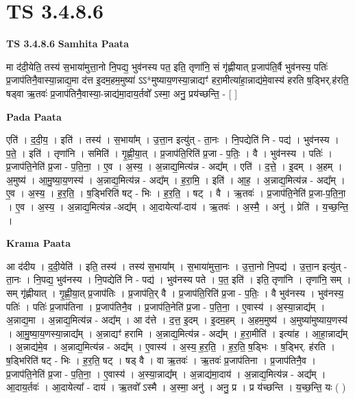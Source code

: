 \documentclass[17pt]{extarticle}
\begin{document}
\section{ TS 3.4.8.6 }

\textbf{TS 3.4.8.6 } \newline
\textbf{Samhita Paata} \newline

मा द॑दी॒येति॒ तस्य॑ स॒भाया॑मुत्ता॒नो नि॒पद्य॒ भुव॑नस्य पत॒ इति॒ तृणा॑नि॒ सं गृ॑ह्णीयात् प्र॒जाप॑ति॒र्वै भुव॑नस्य॒ पतिः॑ प्र॒जाप॑तिनै॒वास्या॒न्नाद्य॒मा द॑त्त इ॒दम॒हम॒मुष्या॑ ऽऽ*मुष्याय॒णस्या॒न्नाद्यꣳ॑ हरा॒मीत्या॑हा॒न्नाद्य॑मे॒वास्य॑ हरति ष॒ड्भिर्.ह॑रति॒ षड्वा ऋ॒तवः॑ प्र॒जाप॑तिनै॒वास्या॒-न्नाद्य॑मा॒दाय॒र्तवो᳚ ऽस्मा॒ अनु॒ प्रय॑च्छन्ति॒ - [  ] \newline

\textbf{Pada Paata} \newline

एति॑ । द॒दी॒य॒ । इति॑ । तस्य॑ । स॒भाया᳚म् । उ॒त्ता॒न इत्यु॑त् - ता॒नः । नि॒पद्येति॑ नि - पद्य॑ । भुव॑नस्य । प॒ते॒ । इति॑ । तृणा॑नि । समिति॑ । गृ॒ह्णी॒या॒त् । प्र॒जाप॑ति॒रिति॑ प्र॒जा - प॒तिः॒ । वै । भुव॑नस्य । पतिः॑ । प्र॒जाप॑ति॒नेति॑ प्र॒जा - प॒ति॒ना॒ । ए॒व । अ॒स्य॒ । अ॒न्नाद्य॒मित्य॑न्न - अद्य᳚म् । एति॑ । द॒त्ते॒ । इ॒दम् । अ॒हम् । अ॒मुष्य॑ । आ॒मु॒ष्या॒य॒णस्य॑ । अ॒न्नाद्य॒मित्य॑न्न - अद्य᳚म् । ह॒रा॒मि॒ । इति॑ । आ॒ह॒ । अ॒न्नाद्य॒मित्य॑न्न - अद्य᳚म् । ए॒व । अ॒स्य॒ । ह॒र॒ति॒ । ष॒ड्भिरिति॑ षट् - भिः । ह॒र॒ति॒ । षट् । वै । ऋ॒तवः॑ । प्र॒जाप॑ति॒नेति॑ प्र॒जा-प॒ति॒ना॒ । ए॒व । अ॒स्य॒ । अ॒न्नाद्य॒मित्य॑न्न -अद्य᳚म् । आ॒दायेत्या᳚-दाय॑ । ऋ॒तवः॑ । अ॒स्मै॒ । अनु॑ । प्रेति॑ । य॒च्छ॒न्ति॒ ।  \newline


\textbf{Krama Paata} \newline

आ द॑दीय । द॒दी॒येति॑ । इति॒ तस्य॑ । तस्य॑ स॒भाया᳚म् । स॒भाया॑मुत्ता॒नः । उ॒त्ता॒नो नि॒पद्य॑ । उ॒त्ता॒न इत्यु॑त् - ता॒नः । नि॒पद्य॒ भुव॑नस्य । नि॒पद्येति॑ नि - पद्य॑ । भुव॑नस्य पते । प॒त॒ इति॑ । इति॒ तृणा॑नि । तृणा॑नि॒ सम् । सम् गृ॑ह्णीयात् । गृ॒ह्णी॒या॒त् प्र॒जाप॑तिः । प्र॒जाप॑ति॒र् वै । प्र॒जाप॑ति॒रिति॑ प्र॒जा - प॒तिः॒ । वै भुव॑नस्य । भुव॑नस्य॒ पतिः॑ । पतिः॑ प्र॒जाप॑तिना । प्र॒जाप॑तिनै॒व । प्र॒जाप॑ति॒नेति॑ प्र॒जा - प॒ति॒ना॒ । ए॒वास्य॑ । अ॒स्या॒न्नाद्य᳚म् । अ॒न्नाद्य॒मा । अ॒न्नाद्य॒मित्य॑न्न - अद्य᳚म् । आ द॑त्ते । द॒त्त॒ इ॒दम् । इ॒दम॒हम् । अ॒हम॒मुष्य॑ । अ॒मुष्या॑मुष्याय॒णस्य॑ । आ॒मु॒ष्या॒य॒णस्या॒न्नाद्य᳚म् । अ॒न्नाद्यꣳ॑ हरामि । अ॒न्नाद्य॒मित्य॑न्न - अद्य᳚म् । ह॒रा॒मीति॑ । इत्या॑ह । आ॒हा॒न्नाद्य᳚म् । अ॒न्नाद्य॑मे॒व । अ॒न्नाद्य॒मित्य॑न्न - अद्य᳚म् । ए॒वास्य॑ । अ॒स्य॒ ह॒र॒ति॒ । ह॒र॒ति॒ ष॒ड्भिः । ष॒ड्भिर्. ह॑रति । ष॒ड्भिरिति॑ षट् - भिः । ह॒र॒ति॒ षट् । षड् वै । वा ऋ॒तवः॑ । ऋ॒तवः॑ प्र॒जाप॑तिना । प्र॒जाप॑तिनै॒व । प्र॒जाप॑ति॒नेति॑ प्र॒जा - प॒ति॒ना॒ । ए॒वास्य॑ । अ॒स्या॒न्नाद्य᳚म् । अ॒न्नाद्य॑मा॒दाय॑ । अ॒न्नाद्य॒मित्य॑न्न - अद्य᳚म् । आ॒दाय॒र्तवः॑ । आ॒दायेत्या᳚ - दाय॑ । ऋ॒तवो᳚ ऽस्मै । अ॒स्मा॒ अनु॑ । अनु॒ प्र । प्र य॑च्छन्ति । य॒च्छ॒न्ति॒ यः ( ) \newline
\end{document}
